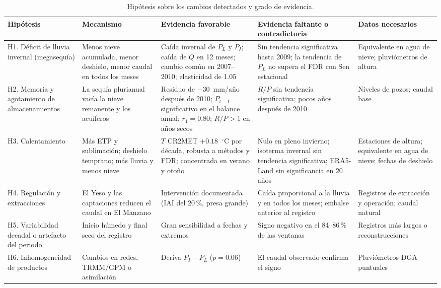 \documentclass[11pt,a4paper]{article}
\newcommand{\PL}{P_L}
\newcommand{\PI}{P_I}
\newcommand{\Qm}{Q}
\begin{document}
\begin{table}[H]
\centering\footnotesize
\caption{Hipótesis sobre los cambios detectados y grado de evidencia.}
\label{tab:hipotesis}
\begin{tabularx}{\textwidth}{>{\raggedright\arraybackslash}p{2.3cm}>{\raggedright\arraybackslash}X>{\raggedright\arraybackslash}X>{\raggedright\arraybackslash}X>{\raggedright\arraybackslash}p{2.4cm}}
\toprule
Hipótesis & Mecanismo & Evidencia favorable & Evidencia faltante o contradictoria & Datos necesarios \\
\midrule
H1. Déficit de lluvia invernal (megasequía) & Menos nieve acumulada, menor deshielo, menor caudal en todos los meses & Caída invernal de $\PL$ y $\PI$; caída de $\Qm$ en 12 meses; cambio común en 2007--2010; elasticidad de 1.05 \citep{Garreaud2017,Garreaud2020} & Sin tendencia significativa hasta 2009; la tendencia de $\PL$ no supera el FDR con Sen estacional & Equivalente en agua de nieve; pluviómetros de altura \\
H2. Memoria y agotamiento de almacenamientos & La sequía plurianual vacía la nieve remanente y los acuíferos & Residuo de $-30$~mm/año después de 2010; $P_{t-1}$ significativo en el balance anual; $r_1=0.80$; $R/P>1$ en años secos \citep{AlvarezGarreton2021} & $R/P$ sin tendencia significativa; pocos años después de 2010 & Niveles de pozos; caudal base \\
H3. Calentamiento & Más ETP y sublimación; deshielo temprano; más lluvia y menos nieve & $T$ CR2MET $+0.18$~$^\circ$C por década, robusta a métodos y FDR; concentrada en verano y otoño \citep{Falvey2009} & Nulo en pleno invierno; isoterma invernal sin tendencia significativa; ERA5-Land sin significancia en 20 años & Estaciones de altura; equivalente en agua de nieve; fechas de deshielo \\
H4. Regulación y extracciones & El Yeso y las captaciones reducen el caudal en El Manzano & Intervención documentada (IAI del 20\,\%, presa grande) & Caída proporcional a la lluvia y en todos los meses; embalse anterior al registro & Registros de extracción y operación; caudal natural \\
H5. Variabilidad decadal o artefacto del periodo & Inicio húmedo y final seco del registro & Gran sensibilidad a fechas y extremos \citep{Boisier2016} & Signo negativo en el 84--86\,\% de las ventanas & Registros más largos o reconstrucciones \\
H6. Inhomogeneidad de productos & Cambios en redes, TRMM/GPM o asimilación & Deriva $\PI-\PL$ ($p=0.06$) & El caudal observado confirma el signo & Pluviómetros DGA puntuales \\
\bottomrule
\end{tabularx}
\end{table}
\end{document}
